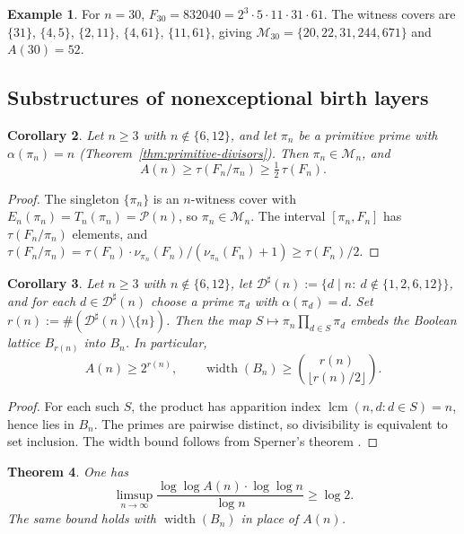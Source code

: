\documentclass[11pt,letterpaper]{article}
\numberwithin{equation}{section}
\theoremstyle{plain}
\newtheorem{theorem}{Theorem}[section]
\newtheorem{corollary}[theorem]{Corollary}
\theoremstyle{definition}
\newtheorem{example}[theorem]{Example}
\theoremstyle{remark}
\DeclareMathOperator{\lcmop}{lcm}
\DeclareMathOperator{\widthop}{width}
\begin{document}
\begin{example}\label{ex:n30}
For $n=30$, $F_{30}=832040=2^3\cdot 5\cdot 11\cdot 31\cdot 61$. The witness
covers are $\{31\}$, $\{4,5\}$, $\{2,11\}$, $\{4,61\}$, $\{11,61\}$, giving
$\mathcal M_{30}=\{20,22,31,244,671\}$ and $A(30)=52$.
\end{example}

\subsection*{Substructures of nonexceptional birth layers}

\begin{corollary}\label{thm:canonical-principal-interval}
Let $n\ge 3$ with $n\notin\{6,12\}$, and let $\pi_n$ be a primitive prime
with $\alpha(\pi_n)=n$ (Theorem~\ref{thm:primitive-divisors}). Then
$\pi_n\in\mathcal M_n$, and
\[
A(n)\ge\tau(F_n/\pi_n)\ge\tfrac{1}{2}\,\tau(F_n).
\]
\end{corollary}

\begin{proof}
The singleton $\{\pi_n\}$ is an $n$-witness cover with
$E_n(\pi_n)=T_n(\pi_n)=\mathcal P(n)$, so $\pi_n\in\mathcal M_n$. The
interval $[\pi_n,F_n]$ has $\tau(F_n/\pi_n)$ elements, and
$\tau(F_n/\pi_n)=\tau(F_n)\cdot\nu_{\pi_n}(F_n)/(\nu_{\pi_n}(F_n)+1)
\ge\tau(F_n)/2$.
\end{proof}

\begin{corollary}\label{thm:boolean-skeleton}
Let $n\ge 3$ with $n\notin\{6,12\}$, let
$\mathcal D^\sharp(n):=\{d\mid n:\ d\notin\{1,2,6,12\}\}$, and for each
$d\in\mathcal D^\sharp(n)$ choose a prime $\pi_d$ with $\alpha(\pi_d)=d$.
Set $r(n):=\#(\mathcal D^\sharp(n)\setminus\{n\})$. Then the map
$S\mapsto\pi_n\prod_{d\in S}\pi_d$ embeds the Boolean lattice $B_{r(n)}$
into $B_n$. In particular,
\[
A(n)\ge 2^{r(n)},
\qquad
\widthop(B_n)\ge\binom{r(n)}{\lfloor r(n)/2\rfloor}.
\]
\end{corollary}

\begin{proof}
For each such $S$, the product has apparition index
$\lcmop(n,d:d\in S)=n$, hence lies in $B_n$. The primes are pairwise
distinct, so divisibility is equivalent to set inclusion. The width bound
follows from Sperner's theorem \cite{Sperner1928Subsets}.
\end{proof}

\begin{theorem}\label{thm:maximal-order}
One has
\[
\limsup_{n\to\infty}
\frac{\log\log A(n)\cdot\log\log n}{\log n}\ge\log 2.
\]
The same bound holds with $\widthop(B_n)$ in place of $A(n)$.
\end{theorem}
\end{document}
